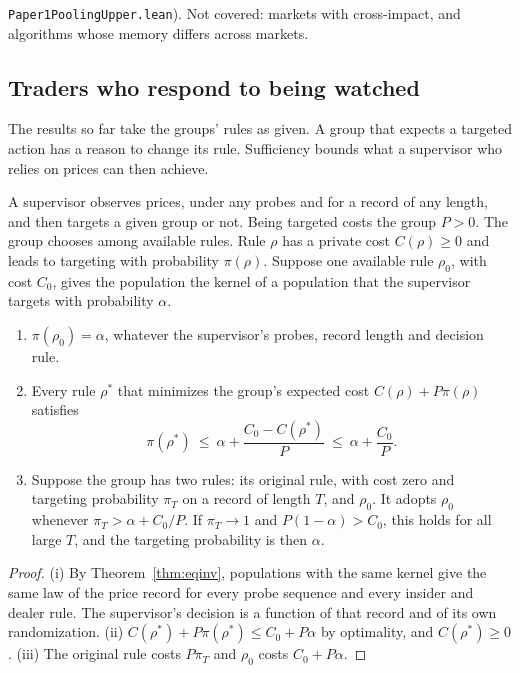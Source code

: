 \nolinkurl{Paper1PoolingUpper.lean}). Not covered: markets with cross-impact, and algorithms whose memory differs across markets.

\subsection{Traders who respond to being watched}\label{sec:hiding}

The results so far take the groups' rules as given. A group that expects a targeted action has a reason to change its rule. Sufficiency bounds what a supervisor who relies on prices can then achieve.

\begin{proposition}\label{prop:hiding}
A supervisor observes prices, under any probes and for a record of any length, and then targets a given group or not. Being targeted costs the group $P>0$. The group chooses among available rules. Rule $\rho$ has a private cost $C(\rho)\ge0$ and leads to targeting with probability $\pi(\rho)$. Suppose one available rule $\rho_0$, with cost $C_0$, gives the population the kernel of a population that the supervisor targets with probability $\alpha$.
\begin{enumerate}[label=(\roman*),itemsep=1pt]
\item $\pi(\rho_0)=\alpha$, whatever the supervisor's probes, record length and decision rule.
\item Every rule $\rho^*$ that minimizes the group's expected cost $C(\rho)+P\pi(\rho)$ satisfies
\[
\pi(\rho^*)\ \le\ \alpha+\frac{C_0-C(\rho^*)}{P}\ \le\ \alpha+\frac{C_0}{P}.
\]
\item Suppose the group has two rules: its original rule, with cost zero and targeting probability $\pi_T$ on a record of length $T$, and $\rho_0$. It adopts $\rho_0$ whenever $\pi_T>\alpha+C_0/P$. If $\pi_T\to1$ and $P(1-\alpha)>C_0$, this holds for all large $T$, and the targeting probability is then $\alpha$.
\end{enumerate}
\end{proposition}

\begin{proof}
(i) By Theorem~\ref{thm:eqinv}, populations with the same kernel give the same law of the price record for every probe sequence and every insider and dealer rule. The supervisor's decision is a function of that record and of its own randomization. (ii) $C(\rho^*)+P\pi(\rho^*)\le C_0+P\alpha$ by optimality, and $C(\rho^*)\ge0$. (iii) The original rule costs $P\pi_T$ and $\rho_0$ costs $C_0+P\alpha$.
\end{proof}

